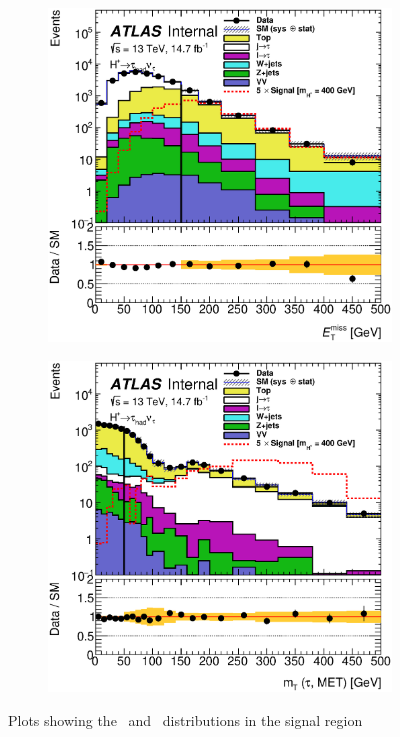 \begin{figure}[!h]
\begin{subfigure}{0.5\textwidth}
					 \includegraphics[width=\textwidth]{figures/met_SR_nMinus1.eps}
\caption{\met}
\end{subfigure} %
\begin{subfigure}{0.5\textwidth}
   \includegraphics[width=\textwidth]{figures/mT_SR_nMinus1.eps}
\caption{\mT}
\end{subfigure}
\caption{Plots showing the \mT\ and \met\ distributions in the signal region}
\label{fig:primSR}
\end{figure}


